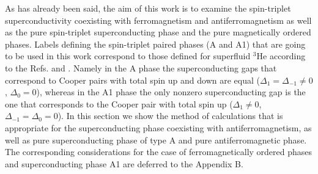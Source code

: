 \documentclass[aps,prb,showpacs,reprint]{revtex4-1}
\begin{document}
As has already been said, the aim of this work is to examine the spin-triplet
superconductivity coexisting with ferromagnetism and antiferromagnetism as
well
as the pure spin-triplet superconducting phase and the pure magnetically ordered
phases. Labels
defining the spin-triplet paired phases (A and A1) that are going to be used in
this work correspond to those defined for superfluid $^3$He according to the
Refs. \cite{Vollhardt} and \cite{Anderson}. Namely in the A phase the
superconducting gaps that correspond to Cooper pairs with total spin up and down
are equal ($\Delta_1=\Delta_{-1}\neq 0$, $\Delta_0=0$), whereas in the A1 phase
the only nonzero superconducting gap is the one that corresponds to the Cooper
pair with total spin up ($\Delta_1\neq 0$, $\Delta_{-1}=\Delta_0=0$). In this
section we show the method of calculations that is appropriate
for the superconducting phase coexisting with antiferromagnetism, as well as pure
superconducting phase of type A and pure antiferromagnetic phase. The
corresponding considerations for the case of ferromagnetically
ordered phases and superconducting phase A1 are deferred to the Appendix B.
\end{document}

